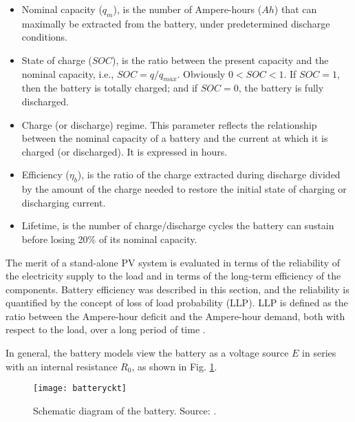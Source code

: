 \begin{itemize}
\item Nominal capacity ($ q_{m} $), is the number of Ampere-hours ($ Ah $) that can maximally be extracted from the battery, under predetermined discharge conditions.
\item State of charge ($ SOC $), is the ratio between the present capacity and the nominal capacity, i.e., $ SOC = q/q_{max} $. Obviously $ 0<SOC<1 $. If $ SOC=1 $, then the battery is totally charged; and if $ SOC=0 $, the battery is fully discharged.
\item Charge (or discharge) regime. This parameter reflects the relationship between the nominal capacity of a battery and the current at which it is charged (or discharged). It is expressed in hours. %
\item Efficiency ($\eta_{b}$), is the ratio of the charge extracted during discharge divided by the amount of the charge needed to restore the initial state of charging or discharging current. 
\item Lifetime, is the number of charge/discharge cycles the battery can sustain before losing 20\% of its nominal capacity.
\end{itemize}

The merit of a stand-alone PV system is evaluated in terms of the reliability of the electricity supply to the load and in terms of the long-term efficiency of the components. Battery efficiency was described in this section, and the reliability is quantified by the concept of loss of load probability (LLP). LLP is defined as the ratio between the Ampere-hour deficit and the Ampere-hour demand, both with respect to the load, over a long period of time \cite{Copetti}. 

In general, the battery models view the battery as a voltage source $ E $ in series with an internal resistance $ R_{0} $, as shown in Fig. \ref{fig:batteryckt}. 

\begin{figure}[h]
\texttt{[image: batteryckt]}
\centering
\caption{Schematic diagram of the battery. Source: \cite{Hansen}.}
\label{fig:batteryckt}
\end{figure}


